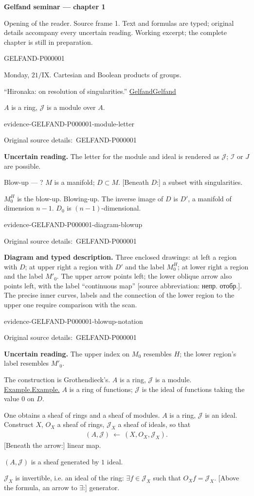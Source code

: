 \documentclass[11pt]{article}
\let\MathUnderline\underline
\renewcommand{\underline}[1]{\ifmmode\MathUnderline{#1}\else\uline{#1}\fi}
\newcommand{\SourcePage}[2]{\par\smallskip\phantomsection\label{#1:source-page}{\small\sffamily\color{blue!55!black}#1}\par\smallskip}
\newcommand{\EvidenceBlock}[4]{%
 \par\smallskip\noindent\begin{minipage}{\linewidth}
 \begin{minipage}[t]{.47\linewidth}\vspace{0pt}\centering
 \csname evidence-#1-#2\endcsname\par
 {\scriptsize\SourceCropCaption\ #1}\par
 \end{minipage}\hfill
 \begin{minipage}[t]{.49\linewidth}\vspace{0pt}\raggedright
 {\small\color{orange!65!black}\textbf{#4} #3}\par
 \end{minipage}
 \end{minipage}\par\smallskip}
\newcommand{\Unclear}[3]{\EvidenceBlock{#1}{#2}{#3}{\ReadingCaption}}
\newcommand{\SourceFigure}[3]{\EvidenceBlock{#1}{#2}{#3}{\DiagramCaption}}
\newcommand{\SourceCropCaption}{Original source details:}\newcommand{\ReadingCaption}{Uncertain reading.}\newcommand{\IncompleteCaption}{Undeciphered passage.}\newcommand{\DiagramCaption}{Diagram and typed description.}
\begin{document}
{\large\bfseries Gelfand seminar — chapter 1}\par
{\small Opening of the reader. Source frame 1. Text and formulas are typed; original details accompany every uncertain reading. Working excerpt; the complete chapter is still in preparation.}\par\medskip
\SourcePage{GELFAND-P000001}{unlabelled}
Monday, $21/\mathrm{IX}$.
Cartesian and Boolean products of groups.

``Hironaka: on resolution of singularities.''
\underline{Gelfand}

$A$ is a ring, $\mathcal{J}$ is a module over $A$.
\Unclear{GELFAND-P000001}{module-letter}{The letter for the module and ideal is rendered as $\mathcal{J}$; $\mathcal{I}$ or $J$ are possible.}

Blow-up --- ?
$M$ is a manifold; $D\subset M$.
[Beneath $D$:] a subset with singularities.

$M_0^H$ is the blow-up. Blowing-up.
The inverse image of $D$ is $D'$, a manifold of dimension $n-1$.
$D_0$ is $(n-1)$-dimensional.
\SourceFigure{GELFAND-P000001}{diagram-blowup}{Three enclosed drawings: at left a region with $D$; at upper right a region with $D'$ and the label $M_0^H$; at lower right a region and the label $M'_0$. The upper arrow points left; the lower oblique arrow also points left, with the label ``continuous map'' [source abbreviation: непр. отобр.]. The precise inner curves, labels and the connection of the lower region to the upper one require comparison with the scan.}
\Unclear{GELFAND-P000001}{blowup-notation}{The upper index on $M_0$ resembles $H$; the lower region's label resembles $M'_0$.}

The construction is Grothendieck's.
$A$ is a ring, $\mathcal{J}$ is a module.
\underline{Example.} $A$ is a ring of functions;
$\mathcal{J}$ is the ideal of functions taking the value $0$ on $D$.

One obtains a sheaf of rings and a sheaf of modules.
$A$ is a ring, $\mathcal{J}$ is an ideal.
Construct $X$, $O_X$ a sheaf of rings,
$\mathcal{J}_X$ a sheaf of ideals, so that
\begin{gather*}
 (A,\mathcal{J})\ \longleftarrow\ (X,O_X,\mathcal{J}_X).
\end{gather*}
[Beneath the arrow:] linear map.

$(A,\mathcal{J})$ is a sheaf generated by $1$ ideal.

$\mathcal{J}_X$ is invertible, i.e. an ideal of the ring:
$\exists f\in\mathcal{J}_X$ such that $O_Xf=\mathcal{J}_X$.
[Above the formula, an arrow to $\exists$:] generator.
\end{document}
